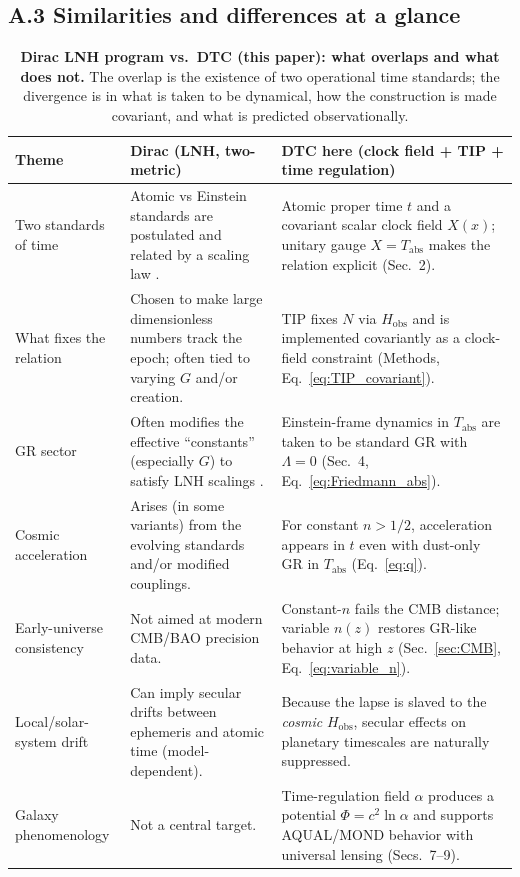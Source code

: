 \documentclass[12pt]{article}
\newcommand{\Tabs}{T_{\mathrm{abs}}}
\newcommand{\Hobs}{H_{\mathrm{obs}}}
\newcommand{\alphaReg}{\alpha}
\begin{document}
\subsection*{A.3 Similarities and differences at a glance}
\begin{table}[t]
\centering
\caption{\textbf{Dirac LNH program vs.\ DTC (this paper): what overlaps and what does not.}
The overlap is the existence of two operational time standards; the divergence is in what is taken to be dynamical,
how the construction is made covariant, and what is predicted observationally.}
\label{tab:dirac_compare}
\vspace{0.1cm}
\begin{tabular}{p{} p{} p{}}
\toprule
Theme & Dirac (LNH, two-metric) & DTC here (clock field + TIP + time regulation) \\
\midrule
Two standards of time &
Atomic vs Einstein standards are postulated and related by a scaling law \citep{Dirac1974,Dirac1979}. &
Atomic proper time $t$ and a covariant scalar clock field $X(x)$; unitary gauge $X=\Tabs$ makes the relation explicit (Sec.~2). \\

What fixes the relation &
Chosen to make large dimensionless numbers track the epoch; often tied to varying $G$ and/or creation. &
TIP fixes $N$ via $\Hobs$ and is implemented covariantly as a clock-field constraint (Methods, Eq.~\eqref{eq:TIP_covariant}). \\

GR sector &
Often modifies the effective ``constants'' (especially $G$) to satisfy LNH scalings \citep{Dirac1937}. &
Einstein-frame dynamics in $\Tabs$ are taken to be standard GR with $\Lambda=0$ (Sec.~4, Eq.~\eqref{eq:Friedmann_abs}). \\

Cosmic acceleration &
Arises (in some variants) from the evolving standards and/or modified couplings. &
For constant $n>1/2$, acceleration appears in $t$ even with dust-only GR in $\Tabs$ (Eq.~\eqref{eq:q}). \\

Early-universe consistency &
Not aimed at modern CMB/BAO precision data. &
Constant-$n$ fails the CMB distance; variable $n(z)$ restores GR-like behavior at high $z$ (Sec.~\ref{sec:CMB}, Eq.~\eqref{eq:variable_n}). \\

Local/solar-system drift &
Can imply secular drifts between ephemeris and atomic time (model-dependent). &
Because the lapse is slaved to the \emph{cosmic} $\Hobs$, secular effects on planetary timescales are naturally suppressed. \\

Galaxy phenomenology &
Not a central target. &
Time-regulation field $\alphaReg$ produces a potential $\Phi=c^{2}\ln\alphaReg$ and supports AQUAL/MOND behavior with universal lensing (Secs.~7--9). \\
\bottomrule
\end{tabular}
\end{table}
\end{document}
